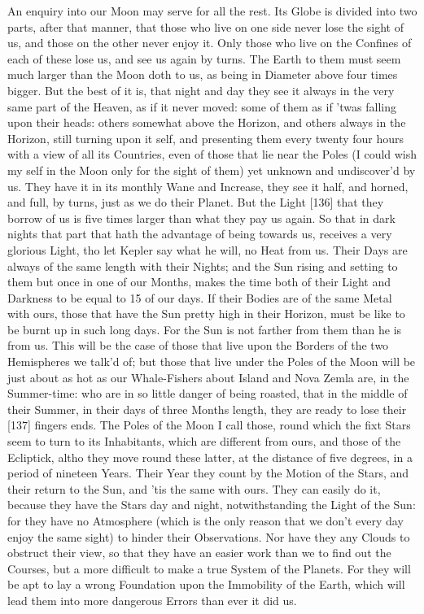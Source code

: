 \documentclass[letterpaper]{book}
\begin{document}
An enquiry into our Moon may serve for all the rest. Its Globe is divided
into two parts, after that manner, that those who live on one side never
lose the sight of us, and those on the other never enjoy it. Only those who
live on the Confines of each of these lose us, and see us again by turns. The
Earth to them must seem much larger than the Moon doth to us, as being in
Diameter above four times bigger. But the best of it is, that night and day
they see it always in the very same part of the Heaven, as if it never moved:
some of them as if 'twas falling upon their heads: others somewhat above
the Horizon, and others always in the Horizon, still turning upon it self, and
presenting them every twenty four hours with a view of all its Countries,
even of those that lie near the Poles (I could wish my self in the Moon only
for the sight of them) yet unknown and undiscover'd by us. They have it
in its monthly Wane and Increase, they see it half, and horned, and full, by
turns, just as we do their Planet. But the Light [136] that they borrow of us
is five times larger than what they pay us again. So that in dark nights that
part that hath the advantage of being towards us, receives a very glorious
Light, tho let Kepler say what he will, no Heat from us. Their Days are
always of the same length with their Nights; and the Sun rising and setting
to them but once in one of our Months, makes the time both of their Light
and Darkness to be equal to 15 of our days. If their Bodies are of the same
Metal with ours, those that have the Sun pretty high in their Horizon, must
be like to be burnt up in such long days. For the Sun is not farther from
them than he is from us. This will be the case of those that live upon the
Borders of the two Hemispheres we talk'd of; but those that live under the
Poles of the Moon will be just about as hot as our Whale-Fishers about
Island and Nova Zemla are, in the Summer-time: who are in so little danger
of being roasted, that in the middle of their Summer, in their days of three
Months length, they are ready to lose their [137] fingers ends. The Poles
of the Moon I call those, round which the fixt Stars seem to turn to its
Inhabitants, which are different from ours, and those of the Ecliptick, altho
they move round these latter, at the distance of five degrees, in a period
of nineteen Years. Their Year they count by the Motion of the Stars, and
their return to the Sun, and 'tis the same with ours. They can easily do it,
because they have the Stars day and night, notwithstanding the Light of the
Sun: for they have no Atmosphere (which is the only reason that we don't
every day enjoy the same sight) to hinder their Observations. Nor have
they any Clouds to obstruct their view, so that they have an easier work
than we to find out the Courses, but a more difficult to make a true System
of the Planets. For they will be apt to lay a wrong Foundation upon the
Immobility of the Earth, which will lead them into more dangerous Errors
than ever it did us.
\end{document}
